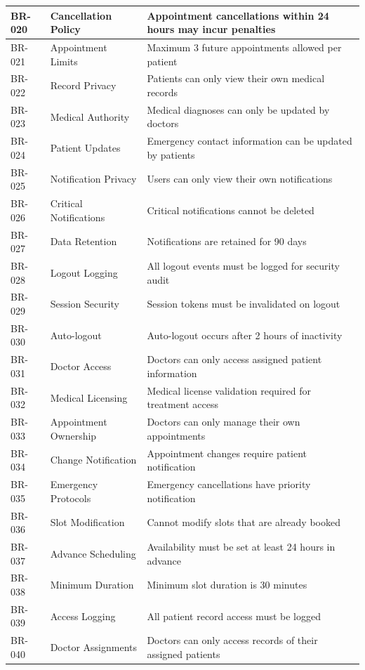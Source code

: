 \documentclass[12pt,a4paper]{article}
\begin{document}
\begin{longtable}{|p{2cm}|p{3cm}|p{9cm}|}
\hline
BR-020 & Cancellation Policy & Appointment cancellations within 24 hours may incur penalties \\
\hline
BR-021 & Appointment Limits & Maximum 3 future appointments allowed per patient \\
\hline
BR-022 & Record Privacy & Patients can only view their own medical records \\
\hline
BR-023 & Medical Authority & Medical diagnoses can only be updated by doctors \\
\hline
BR-024 & Patient Updates & Emergency contact information can be updated by patients \\
\hline
BR-025 & Notification Privacy & Users can only view their own notifications \\
\hline
BR-026 & Critical Notifications & Critical notifications cannot be deleted \\
\hline
BR-027 & Data Retention & Notifications are retained for 90 days \\
\hline
BR-028 & Logout Logging & All logout events must be logged for security audit \\
\hline
BR-029 & Session Security & Session tokens must be invalidated on logout \\
\hline
BR-030 & Auto-logout & Auto-logout occurs after 2 hours of inactivity \\
\hline
BR-031 & Doctor Access & Doctors can only access assigned patient information \\
\hline
BR-032 & Medical Licensing & Medical license validation required for treatment access \\
\hline
BR-033 & Appointment Ownership & Doctors can only manage their own appointments \\
\hline
BR-034 & Change Notification & Appointment changes require patient notification \\
\hline
BR-035 & Emergency Protocols & Emergency cancellations have priority notification \\
\hline
BR-036 & Slot Modification & Cannot modify slots that are already booked \\
\hline
BR-037 & Advance Scheduling & Availability must be set at least 24 hours in advance \\
\hline
BR-038 & Minimum Duration & Minimum slot duration is 30 minutes \\
\hline
BR-039 & Access Logging & All patient record access must be logged \\
\hline
BR-040 & Doctor Assignments & Doctors can only access records of their assigned patients \\

\end{longtable}
\end{document}
